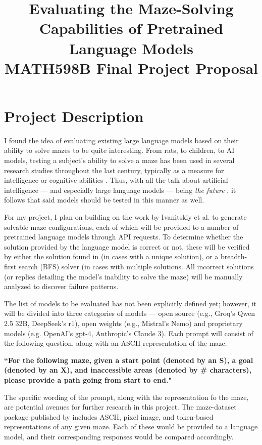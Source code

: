 \documentclass[conference]{IEEEtran}
\title{Evaluating the Maze-Solving Capabilities of Pretrained Language Models\\
{\footnotesize MATH598B Final Project Proposal}}
\author{\IEEEauthorblockN{Gabriel Del Castillo}
\IEEEauthorblockA{\textit{Department of Computer Science} \\
\textit{Colorado School of Mines}\\
Golden, CO, USA \\
gdelcastillo@mines.edu}
}
\begin{document}
\maketitle

\section{Project Description}

I found the idea of evaluating existing large language models based on their ability to solve mazes to be quite interesting. From rats, to children, to AI models, testing a subject's ability to solve a maze has been used in several research studies throughout the last century, typically as a measure for intelligence or cognitive abilities \cite{ext1, ext2, ext3}. Thus, with all the talk about artificial intelligence --- and especially large language models --- being \textit{the future} \cite{art1, art2}, it follows that said models should be tested in this manner as well.

For my project, I plan on building on the work by Ivanitskiy et al. \cite{int1} to generate solvable maze configurations, each of which will be provided to a number of pretrained language models through API requests. To determine whether the solution provided by the language model is correct or not, these will be verified by either the solution found in \cite{int1} (in cases with a unique solution), or a breadth-first search (BFS) solver (in cases with multiple solutions. All incorrect solutions (or replies detailing the model's inability to solve the maze) will be manually analyzed to discover failure patterns.

The list of models to be evaluated has not been explicitly defined yet; however, it will be divided into three categories of models --- open source (e.g., Groq's Qwen 2.5 32B, DeepSeek's r1), open weights (e.g., Mistral's Nemo) and proprietary models (e.g. OpenAI's gpt-4, Anthropic's Claude 3). Each prompt will consist of the following question, along with an ASCII representation of the maze.

\begin{center}
\textbf{``For the following maze, given a start point (denoted by an S), a goal (denoted by an X), and inaccessible areas (denoted by \# characters), please provide a path going from start to end."}
\end{center}

The specific wording of the prompt, along with the representation fo the maze, are potential avenues for further research in this project. The maze-dataset package published by \cite{int1} includes ASCII, pixel image, and token-based representations of any given maze. Each of these would be provided to a language model, and their corresponding responses would be compared accordingly.
\end{document}
